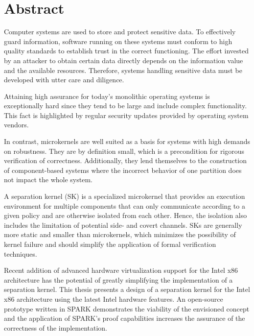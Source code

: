 \chapter*{Abstract}
Computer systems are used to store and protect sensitive data. To effectively
guard information, software running on these systems must conform to high
quality standards to establish trust in the correct functioning. The effort
invested by an attacker to obtain certain data directly depends on the
information value and the available resources. Therefore, systems handling
sensitive data must be developed with utter care and diligence.

Attaining high assurance for today's monolithic operating systems is
exceptionally hard since they tend to be large and include complex
functionality. This fact is highlighted by regular security updates provided by
operating system vendors.

In contrast, microkernels are well suited as a basis for systems with high
demands on robustness. They are by definition small, which is a precondition
for rigorous verification of correctness. Additionally, they lend themselves to
the construction of component-based systems where the incorrect behavior of one
partition does not impact the whole system.

A separation kernel (SK) is a specialized microkernel that provides an execution
environment for multiple components that can only communicate according to a
given policy and are otherwise isolated from each other. Hence, the isolation
also includes the limitation of potential side- and covert channels. SKs are
generally more static and smaller than microkernels, which minimizes the
possibility of kernel failure and should simplify the application of formal
verification techniques.

Recent addition of advanced hardware virtualization support for the Intel x86
architecture has the potential of greatly simplifying the implementation of a
separation kernel. This thesis presents a design of a separation kernel for the
Intel x86 architecture using the latest Intel hardware features. An open-source
prototype written in SPARK demonstrates the viability of the envisioned concept
and the application of SPARK's proof capabilities increases the assurance of the
correctness of the implementation.
